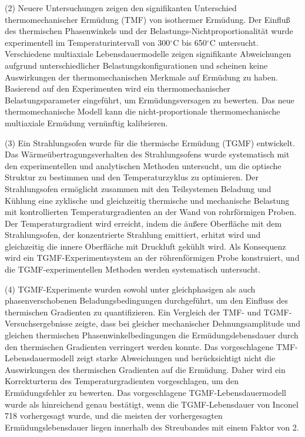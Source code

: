 (2) Neuere Untersuchungen zeigen den signifikanten Unterschied thermomechanischer Ermüdung (TMF) von isothermer Ermüdung. Der Einfluß des thermischen Phasenwinkels und der Belastungs-Nichtproportionalität wurde experimentell im Temperaturintervall von 300$^{\circ}$C bis 650$^{\circ}$C untersucht. Verschiedene multiaxiale Lebensdauermodelle zeigen signifikante Abweichungen aufgrund unterschiedlicher Belastungskonfigurationen und scheinen keine Auswirkungen der thermomechanischen Merkmale auf Ermüdung zu haben. Basierend auf den Experimenten wird ein thermomechanischer Belastungsparameter eingeführt, um Ermüdungsversagen zu bewerten. Das neue thermomechanische Modell kann die nicht-proportionale thermomechanische multiaxiale Ermüdung vernünftig kalibrieren.

(3) Ein Strahlungsofen wurde für die thermische Ermüdung (TGMF) entwickelt. Das Wärmeübertragungsverhalten des Strahlungsofens wurde systematisch mit den experimentellen und analytischen Methoden untersucht, um die optische Struktur zu bestimmen und den Temperaturzyklus zu optimieren. Der Strahlungsofen ermöglicht zusammen mit den Teilsystemen Beladung und Kühlung eine zyklische und gleichzeitig thermische und mechanische Belastung mit kontrollierten Temperaturgradienten an der Wand von rohrförmigen Proben. Der Temperaturgradient wird erreicht, indem die äußere Oberfläche mit dem Strahlungsofen, der konzentrierte Strahlung emittiert, erhitzt wird und gleichzeitig die innere Oberfläche mit Druckluft gekühlt wird. Als Konsequenz wird ein TGMF-Experimentsystem an der röhrenförmigen Probe konstruiert, und die TGMF-experimentellen Methoden werden systematisch untersucht.

(4) TGMF-Experimente wurden sowohl unter gleichphasigen als auch phasenverschobenen Beladungsbedingungen durchgeführt, um den Einfluss des thermischen Gradienten zu quantifizieren. Ein Vergleich der TMF- und TGMF-Versuchsergebnisse zeigte, dass bei gleicher mechanischer Dehnungsamplitude und gleichen thermischen Phasenwinkelbedingungen die Ermüdungslebensdauer durch den thermischen Gradienten verringert werden konnte. Das vorgeschlagene TMF-Lebensdauermodell zeigt starke Abweichungen und berücksichtigt nicht die Auswirkungen des thermischen Gradienten auf die Ermüdung. Daher wird ein Korrekturterm des Temperaturgradienten vorgeschlagen, um den Ermüdungsfehler zu bewerten. Das vorgeschlagene TGMF-Lebensdauermodell wurde als hinreichend genau bestätigt, wenn die TGMF-Lebensdauer von Inconel 718 vorhergesagt wurde, und die meisten der vorhergesagten Ermüdungslebensdauer liegen innerhalb des Streubandes mit einem Faktor von 2.